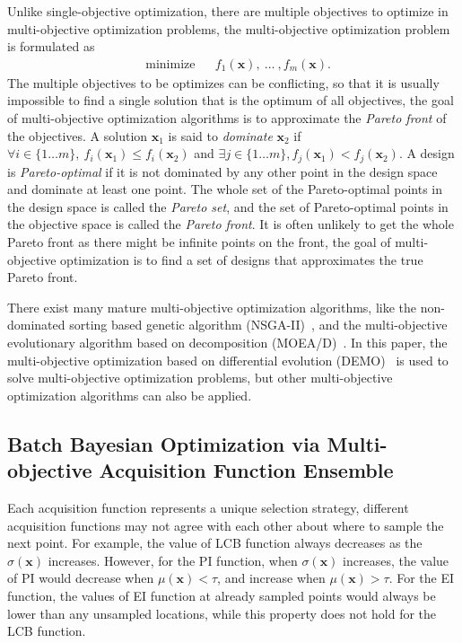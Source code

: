 Unlike single-objective optimization, there are multiple objectives to optimize in multi-objective optimization problems\cite{MO_overview}, the multi-objective optimization problem is formulated as
\begin{equation}
    \label{eq:MOFormulation}
    \begin{aligned}
        & \text{minimize} & & f_1(\bm{x}),~\dots~,f_m(\bm{x}).
    \end{aligned}
\end{equation}
The multiple objectives to be optimizes can be conflicting, so that it is usually impossible to find a single solution that is the optimum of all objectives, the goal of multi-objective optimization algorithms is to approximate the \emph{Pareto front} of the objectives. A solution $\bm{x}_1$ is said to \emph{dominate} $\bm{x}_2$ if $\forall i \in \{1\dots m\},~f_i(\bm{x}_1) \le f_i(\bm{x}_2)$ and $\exists j \in \{1\dots m\}, f_j(\bm{x}_1) < f_j(\bm{x}_2)$. A design is \emph{Pareto-optimal} if it is not dominated by any other point in the design space and dominate at least one point. The whole set of the Pareto-optimal points in the design space is called the \emph{Pareto set}, and the set of Pareto-optimal points in the objective space is called the \emph{Pareto front}. It is often unlikely to get the whole Pareto front as there might be infinite points on the front, the goal of multi-objective optimization is to find a set of designs that approximates the true Pareto front.

There exist many mature multi-objective optimization algorithms, like the non-dominated sorting based genetic algorithm (NSGA-II)~\cite{nsgaii}, and the multi-objective evolutionary algorithm based on decomposition (MOEA/D)~\cite{moead}. In this paper, the multi-objective optimization based on differential evolution (DEMO)~\cite{demo} is used to solve multi-objective optimization problems, but other multi-objective optimization algorithms can also be applied.

\subsection{Batch Bayesian Optimization via Multi-objective Acquisition Function Ensemble}

Each acquisition function represents a unique selection strategy, different acquisition functions may not agree with each other about where to sample the next point. For example, the value of LCB function always decreases as the $\sigma(\bm{x})$ increases. However, for the PI function, when $\sigma(\bm{x})$ increases, the value of PI would decrease when $\mu(\bm{x}) < \tau$, and increase when $\mu(\bm{x}) > \tau$. For the EI function, the values of EI function at already sampled points would always be lower than any unsampled locations, while this property does not hold for the LCB function.


